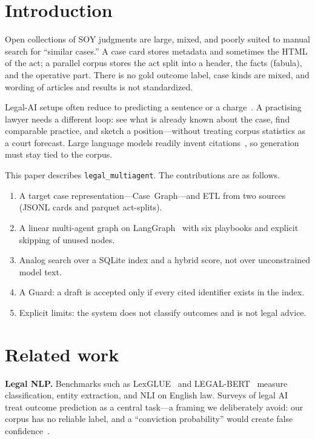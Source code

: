 \documentclass[preprint,12pt]{elsarticle}
\begin{document}
\section{Introduction}

Open collections of SOY judgments are large, mixed, and poorly suited to manual search for ``similar cases.'' A case card stores metadata and sometimes the HTML of the act; a parallel corpus stores the act split into a header, the facts (fabula), and the operative part. There is no gold outcome label, case kinds are mixed, and wording of articles and results is not standardized.

Legal-AI setups often reduce to predicting a sentence or a charge~\cite{zhong2020legal,chalkidis2022lexglue}. A practising lawyer needs a different loop: see what is already known about the case, find comparable practice, and sketch a position---without treating corpus statistics as a court forecast. Large language models readily invent citations~\cite{magesh2024hallucination}, so generation must stay tied to the corpus.

This paper describes \texttt{legal\_multiagent}. The contributions are as follows.

\begin{enumerate}
\item A target case representation---Case~Graph---and ETL from two sources (JSONL cards and parquet act-splits).
\item A linear multi-agent graph on LangGraph~\cite{langgraph2024} with six playbooks and explicit skipping of unused nodes.
\item Analog search over a SQLite index and a hybrid score, not over unconstrained model text.
\item A Guard: a draft is accepted only if every cited identifier exists in the index.
\item Explicit limits: the system does not classify outcomes and is not legal advice.
\end{enumerate}

\section{Related work}

\textbf{Legal NLP.} Benchmarks such as LexGLUE~\cite{chalkidis2022lexglue} and LEGAL-BERT~\cite{chalkidis2020legalbert} measure classification, entity extraction, and NLI on English law. Surveys of legal AI~\cite{zhong2020legal} treat outcome prediction as a central task---a framing we deliberately avoid: our corpus has no reliable label, and a ``conviction probability'' would create false confidence~\cite{lockey2021trust}.
\end{document}
